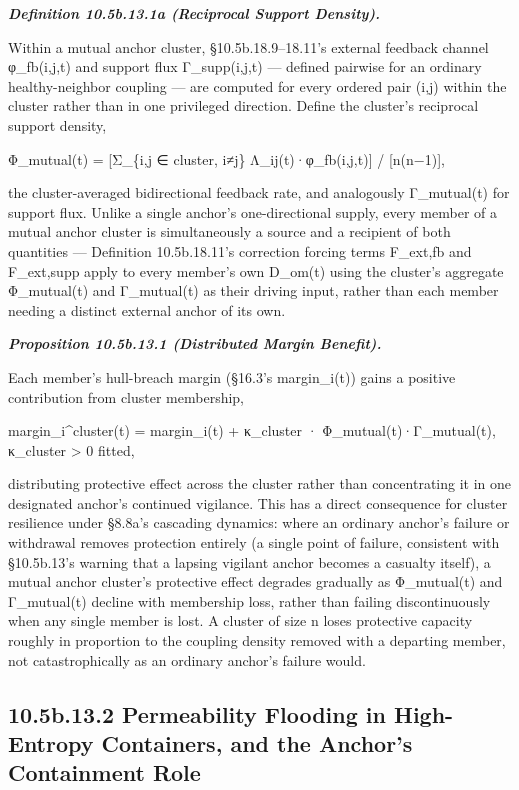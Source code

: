 \documentclass[
]{article}
\begin{document}
\emph{\textbf{Definition 10.5b.13.1a (Reciprocal Support Density).}}

Within a mutual anchor cluster, §10.5b.18.9--18.11's external feedback
channel φ\_fb(i,j,t) and support flux Γ\_supp(i,j,t) --- defined
pairwise for an ordinary healthy-neighbor coupling --- are computed for
every ordered pair (i,j) within the cluster rather than in one
privileged direction. Define the cluster's reciprocal support density,

Φ\_mutual(t) = {[}Σ\_\{i,j ∈ cluster, i≠j\} Λ\_ij(t)·φ\_fb(i,j,t){]} /
{[}n(n−1){]},

the cluster-averaged bidirectional feedback rate, and analogously
Γ\_mutual(t) for support flux. Unlike a single anchor's one-directional
supply, every member of a mutual anchor cluster is simultaneously a
source and a recipient of both quantities --- Definition 10.5b.18.11's
correction forcing terms F\_ext,fb and F\_ext,supp apply to every
member's own D\_om(t) using the cluster's aggregate Φ\_mutual(t) and
Γ\_mutual(t) as their driving input, rather than each member needing a
distinct external anchor of its own.

\emph{\textbf{Proposition 10.5b.13.1 (Distributed Margin Benefit).}}

Each member's hull-breach margin (§16.3's margin\_i(t)) gains a positive
contribution from cluster membership,

margin\_i\^{}cluster(t) = margin\_i(t) + κ\_cluster ·
Φ\_mutual(t)·Γ\_mutual(t), κ\_cluster \textgreater{} 0 fitted,

distributing protective effect across the cluster rather than
concentrating it in one designated anchor's continued vigilance. This
has a direct consequence for cluster resilience under §8.8a's cascading
dynamics: where an ordinary anchor's failure or withdrawal removes
protection entirely (a single point of failure, consistent with
§10.5b.13's warning that a lapsing vigilant anchor becomes a casualty
itself), a mutual anchor cluster's protective effect degrades gradually
as Φ\_mutual(t) and Γ\_mutual(t) decline with membership loss, rather
than failing discontinuously when any single member is lost. A cluster
of size n loses protective capacity roughly in proportion to the
coupling density removed with a departing member, not catastrophically
as an ordinary anchor's failure would.

\hypertarget{b.13.2-permeability-flooding-in-high-entropy-containers-and-the-anchors-containment-role}{%
\subsection{10.5b.13.2 Permeability Flooding in High-Entropy Containers,
and the Anchor's Containment
Role}\label{b.13.2-permeability-flooding-in-high-entropy-containers-and-the-anchors-containment-role}}
\end{document}
